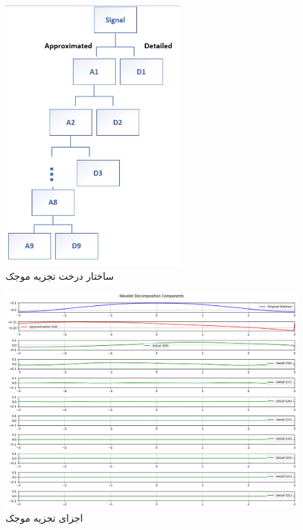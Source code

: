\documentclass[12pt,a4paper]{article}
\begin{document}
\begin{figure}[h!]
    \centering
    \includegraphics[width=0.6\textwidth]{Tree graph.jpg}
    \caption{ساختار درخت تجزیه موجک}
\end{figure}

\begin{figure}[h!]
    \centering
    \includegraphics[width=\textwidth]{3.png}
    \caption{اجزای تجزیه موجک}
\end{figure}

\newpage

\clearpage
\end{document}
